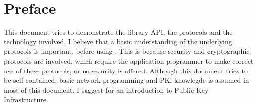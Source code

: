 \chapter{Preface}

This document tries to demonstrate the \gnutls{} library API, the
protocols and the technology involved. I believe that a basic
understanding of the underlying protocols is important, before
using \tls{}. This is because security and cryptographic
protocols are involved, which require the application programmer
to make correct use of these protocols, or no security is
offered. Although this document tries to be self contained, basic 
network programming and PKI knowlegde is assumed in most of this document. 
I suggest \cite{GUTPKI} for an introduction to Public Key Infrastructure.
